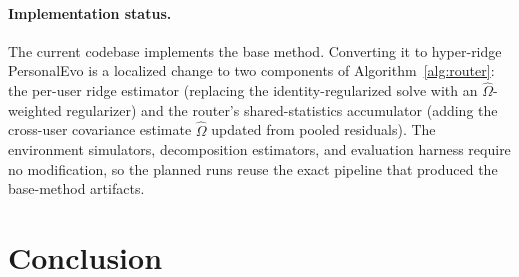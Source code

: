 \documentclass{article} %
\begin{document}
\paragraph{Implementation status.} The current codebase implements the base method. Converting it to hyper-ridge PersonalEvo is a localized change to two components of Algorithm~\ref{alg:router}: the per-user ridge estimator (replacing the identity-regularized solve with an $\widehat\Omega$-weighted regularizer) and the router's shared-statistics accumulator (adding the cross-user covariance estimate $\widehat\Omega$ updated from pooled residuals). The environment simulators, decomposition estimators, and evaluation harness require no modification, so the planned runs reuse the exact pipeline that produced the base-method artifacts.

\section{Conclusion}

\label{sec:conclusion}
\end{document}
